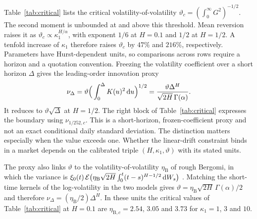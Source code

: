 Table~\ref{tab:critical} lists the critical volatility-of-volatility $\vartheta_c=(\int_0^\infty G^2)^{-1/2}$. The second moment is unbounded at and above this threshold. Mean reversion raises it as $\vartheta_c\propto\kappa_1^{H/\alpha}$, with exponent $1/6$ at $H=0.1$ and $1/2$ at $H=1/2$. A tenfold increase of $\kappa_1$ therefore raises $\vartheta_c$ by $47\%$ and $216\%$, respectively. Parameters have Hurst-dependent units, so comparisons across rows require a horizon and a quotation convention. Freezing the volatility coefficient over a short horizon $\Delta$ gives the leading-order innovation proxy
\begin{equation*}
\nu_\Delta=\vartheta\Big(\int_0^\Delta K(u)^2\,\mathrm{d} u\Big)^{1/2}
=\frac{\vartheta\Delta^H}{\sqrt{2H}\,\Gamma(\alpha)}.
\end{equation*}
It reduces to $\vartheta\sqrt\Delta$ at $H=1/2$. The right block of Table~\ref{tab:critical} expresses the boundary using $\nu_{1/252,c}$. This is a short-horizon, frozen-coefficient proxy and not an exact conditional daily standard deviation. The distinction matters especially when the value exceeds one. Whether the linear-drift constraint binds in a market depends on the calibrated triple $(H,\kappa_1,\vartheta)$ with its stated units.

The proxy also links $\vartheta$ to the volatility-of-volatility $\eta_{\mathrm{B}}$ of rough Bergomi, in which the variance is $\xi_0(t)\,\mathcal{E}\big(\eta_{\mathrm{B}}\sqrt{2H}\int_0^t(t-s)^{H-1/2}\,\mathrm{d} W_s\big)$ \citep{BayerFrizGatheral2016}. Matching the short-time kernels of the log-volatility in the two models gives $\vartheta=\eta_{\mathrm{B}}\sqrt{2H}\,\Gamma(\alpha)/2$ and therefore $\nu_\Delta=(\eta_{\mathrm{B}}/2)\Delta^H$. In these units the critical values of Table~\ref{tab:critical} at $H=0.1$ are $\eta_{\mathrm{B},c}=2.54$, $3.05$ and $3.73$ for $\kappa_1=1$, $3$ and $10$.

